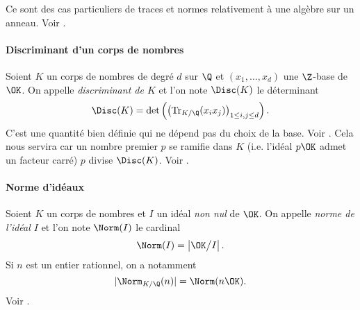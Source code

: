 	Ce sont des cas particuliers de traces et normes relativement à une algèbre sur un anneau. Voir \cite[ch. II § 6]{Samuel}.


\paragraph{Discriminant d'un corps de nombres} Soient $K$ un corps de nombres de degré $d$ sur $\Q$ et $(x_1, \dots, x_d)$ une $\Z$-base de $\OK$. On appelle \emph{discriminant de $K$} et l'on note $\Disc(K)$ le déterminant \[\Disc(K) = \det\left(\left(\mathrm{Tr}_{K/\Q}(x_i x_j)\right)_{1\leq i, j \leq d}\right).\] C'est une quantité bien définie qui ne dépend pas du choix de la base. Voir \cite[ch. II § 7]{Samuel}. Cela nous servira car un nombre premier $p$ se ramifie dans $K$ (i.e. l'idéal $p\OK$ admet un facteur carré) \ssi $p$ divise $\Disc(K)$. Voir \cite[ch. V § 3]{Samuel}.

\paragraph{Norme d'idéaux} Soient $K$ un corps de nombres et $I$ un idéal \emph{non nul} de $\OK$. On appelle \emph{norme de l'idéal $I$} et l'on note $\Norm(I)$ le cardinal \[\Norm(I) = \left|\OK\big/I\right|.\] Si $n$ est un entier rationnel, on a notamment \[|\Norm_{K/\Q}(n)| = \Norm(n\OK).\] Voir \cite[ch. III § 5]{Samuel}.
